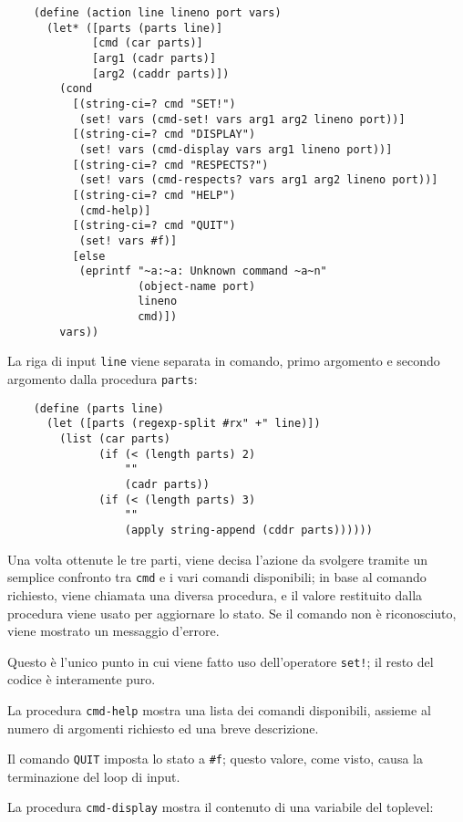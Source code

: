 \begin{lstlisting}
    (define (action line lineno port vars)
      (let* ([parts (parts line)]
             [cmd (car parts)]
             [arg1 (cadr parts)]
             [arg2 (caddr parts)])
        (cond
          [(string-ci=? cmd "SET!")
           (set! vars (cmd-set! vars arg1 arg2 lineno port))]
          [(string-ci=? cmd "DISPLAY")
           (set! vars (cmd-display vars arg1 lineno port))]
          [(string-ci=? cmd "RESPECTS?")
           (set! vars (cmd-respects? vars arg1 arg2 lineno port))]
          [(string-ci=? cmd "HELP")
           (cmd-help)]
          [(string-ci=? cmd "QUIT")
           (set! vars #f)]
          [else
           (eprintf "~a:~a: Unknown command ~a~n"
                    (object-name port)
                    lineno
                    cmd)])
        vars))
\end{lstlisting}

La riga di input \lstinline{line} viene separata in comando, primo
argomento e secondo argomento dalla procedura \lstinline{parts}:

\begin{lstlisting}
    (define (parts line)
      (let ([parts (regexp-split #rx" +" line)])
        (list (car parts)
              (if (< (length parts) 2)
                  ""
                  (cadr parts))
              (if (< (length parts) 3)
                  ""
                  (apply string-append (cddr parts))))))
\end{lstlisting}

Una volta ottenute le tre parti, viene decisa l'azione da svolgere
tramite un semplice confronto tra \lstinline{cmd} e i vari comandi
disponibili; in base al comando richiesto, viene chiamata una diversa
procedura, e il valore restituito dalla procedura viene usato per
aggiornare lo stato. Se il comando non \`e riconosciuto, viene mostrato
un messaggio d'errore.

Questo \`e l'unico punto in cui viene fatto uso dell'operatore
\lstinline{set!}; il resto del codice \`e interamente puro.

La procedura \lstinline{cmd-help} mostra una lista dei comandi
disponibili, assieme al numero di argomenti richiesto ed una breve
descrizione.

Il comando \lstinline{QUIT} imposta lo stato a \lstinline{#f}; questo
valore, come visto, causa la terminazione del loop di input.

La procedura \lstinline{cmd-display} mostra il contenuto di una
variabile del toplevel:

